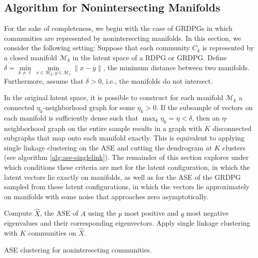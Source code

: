\documentclass[
  12pt,
]{article}
\theoremstyle{definition}
\theoremstyle{definition}
\theoremstyle{definition}
\theoremstyle{definition}
\theoremstyle{remark}
\begin{document}
\hypertarget{sec:nonintersect}{%
\subsection{Algorithm for Nonintersecting Manifolds}\label{sec:nonintersect}}

For the sake of completeness, we begin with the case of GRDPGs in which communities are represented by nonintersecting manifolds.
In this section, we consider the following setting: Suppose that each community \(C_k\) is represented by a closed manifold \(\mathcal{M}_k\) in the latent space of a RDPG or GRDPG.
Define \(\delta = \min\limits_{k \neq \ell} \min\limits_{x \in \mathcal{M}_k, y \in \mathcal{M}_\ell} \|x - y\|\), the minimum distance between two manifolds.
Furthermore, assume that \(\delta > 0\), i.e., the manifolds do not intersect.

In the original latent space, it is possible to construct for each manifold \(\mathcal{M}_k\) a connected \(\eta_k\)-neighborhood graph for some \(\eta_k > 0\).
If the subsample of vectors on each manifold is sufficiently dense such that \(\max_k \eta_k = \eta < \delta\), then an \(\eta\)-neighborhood graph on the entire sample results in a graph with \(K\) disconnected subgraphs that map onto each manifold exactly.
This is equivalent to applying single linkage clustering on the ASE and cutting the dendrogram at \(K\) clusters (see algorithm \ref{alg:ase-singlelink}).
The remainder of this section explores under which conditions these criteria are met for the latent configuration, in which the latent vectors lie exactly on manifolds, as well as for the ASE of the GRDPG sampled from these latent configurations, in which the vectors lie approximately on manifolds with some noise that approaches zero asymptotically.

\begin{algorithm}[h]
\label{alg:ase-singlelink}
\DontPrintSemicolon
\SetAlgoLined
{}
Compute $\hat{X}$, the ASE of $A$ using the $p$ most positive and $q$ most negative eigenvalues and their corresponding eigenvectors.\;
Apply single linkage clustering with $K$ communities on $\hat{X}$.\;
\caption{ASE clustering for nonintersecting communities.}
\end{algorithm}
\end{document}
